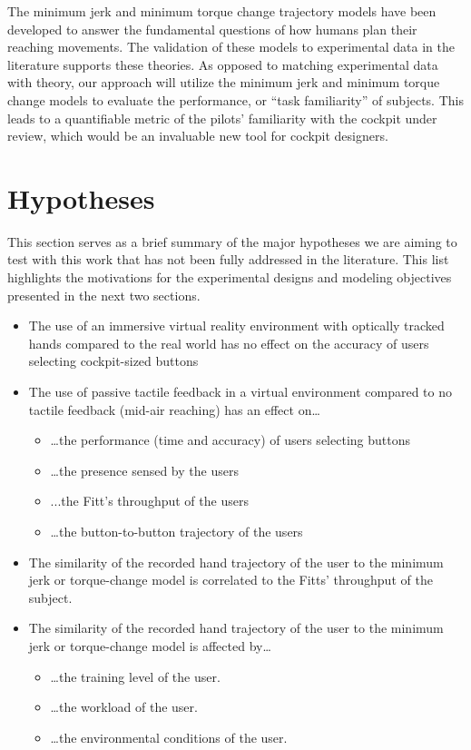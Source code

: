 The minimum jerk and minimum torque change trajectory models have been developed to answer the fundamental questions of how humans plan their reaching movements.
The validation of these models to experimental data in the literature supports these theories.
As opposed to matching experimental data with theory, our approach will utilize the minimum jerk and minimum torque change models to evaluate the performance, or ``task familiarity'' of subjects.
This leads to a quantifiable metric of the pilots' familiarity with the cockpit under review, which would be an invaluable new tool for cockpit designers.

\section{Hypotheses}
\label{hypotheses}

This section serves as a brief summary of the major hypotheses we are aiming to test with this work that has not been fully addressed in the literature.
This list highlights the motivations for the experimental designs and modeling objectives presented in the next two sections.

\begin{itemize}
\item
  The use of an immersive virtual reality environment with optically tracked hands compared to the real world has no effect on the accuracy of users selecting cockpit-sized buttons
\item
  The use of passive tactile feedback in a virtual environment compared to no tactile feedback (mid-air reaching) has an effect on\ldots{}
  \begin{itemize}
  \item \ldots{}the performance (time and accuracy) of users selecting buttons
  \item \ldots{}the presence sensed by the users
  \item ...the Fitt's throughput of the users
  \item \ldots{}the button-to-button trajectory of the users
  \end{itemize}
\item The similarity of the recorded hand trajectory of the user to the minimum jerk or torque-change model is correlated to the Fitts' throughput of the subject.
\item The similarity of the recorded hand trajectory of the user to the minimum jerk or torque-change model is affected by\ldots{}
  \begin{itemize}
  \item \ldots{}the training level of the user.
  \item \ldots{}the workload of the user.
  \item \ldots{}the environmental conditions of the user.
  \end{itemize}
\end{itemize}


